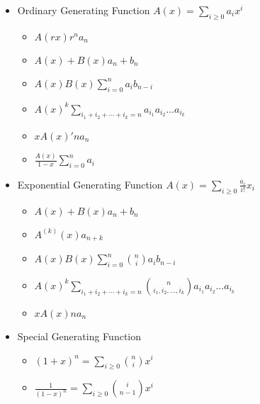\begin{itemize}
\item Ordinary Generating Function
$A(x) = \sum_{i\ge 0} a_ix^i$
\begin{itemize}
    \itemsep-0.5em
    \item $A(rx)             $\Rightarrow$ r^na_n$
    \item $A(x) + B(x)       $\Rightarrow$ a_n + b_n$
    \item $A(x)B(x)          $\Rightarrow$ \sum_{i=0}^{n} a_ib_{n-i}$
    \item $A(x)^k            $\Rightarrow$ \sum_{i_1+i_2+\cdots+i_k=n} a_{i_1}a_{i_2}\ldots a_{i_k}$
    \item $xA(x)'            $\Rightarrow$ na_n$
    \item $\frac{A(x)}{1-x}  $\Rightarrow$ \sum_{i=0}^{n} a_i$
\end{itemize}
\item Exponential Generating Function
$A(x) = \sum_{i\ge 0} \frac{a_i}{i!}x_i$
\begin{itemize}
    \itemsep-0.5em
    \item $A(x) + B(x)       $\Rightarrow$ a_n + b_n$
    \item $A^{(k)}(x)        $\Rightarrow$ a_{n+k}$
    \item $A(x)B(x)          $\Rightarrow$ \sum_{i=0}^{n} \binom{n}{i}a_ib_{n-i}$
    \item $A(x)^k            $\Rightarrow$ \sum_{i_1+i_2+\cdots+i_k=n} \binom{n}{i_1, i_2, \ldots, i_k}a_{i_1}a_{i_2}\ldots a_{i_k}$
    \item $xA(x)             $\Rightarrow$ na_n$
\end{itemize}
\item Special Generating Function
\begin{itemize}
    \itemsep-0.5em
    \item $(1+x)^n           = \sum_{i\ge 0} \binom{n}{i}x^i$
    \item $\frac{1}{(1-x)^n} = \sum_{i\ge 0} \binom{i}{n-1}x^i$
\end{itemize}
\end{itemize}
